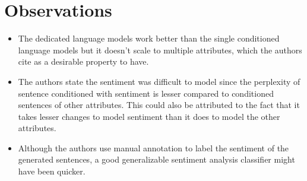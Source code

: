 \documentclass[12pt]{article}
\begin{document}
\section{Observations}
  \begin{itemize}
    \item The dedicated language models work better than the single conditioned language models but it doesn't scale to multiple attributes, which the authors cite as a desirable property to have.
    \item The authors state the sentiment was difficult to model since the perplexity of sentence conditioned with sentiment is lesser compared to conditioned sentences of other attributes. This could also be attributed to the fact that it takes lesser changes to model sentiment than it does to model the other attributes.
    \item Although the authors use manual annotation to label the sentiment of the generated sentences, a good generalizable sentiment analysis classifier might have been quicker.
  \end{itemize}



\end{document}
